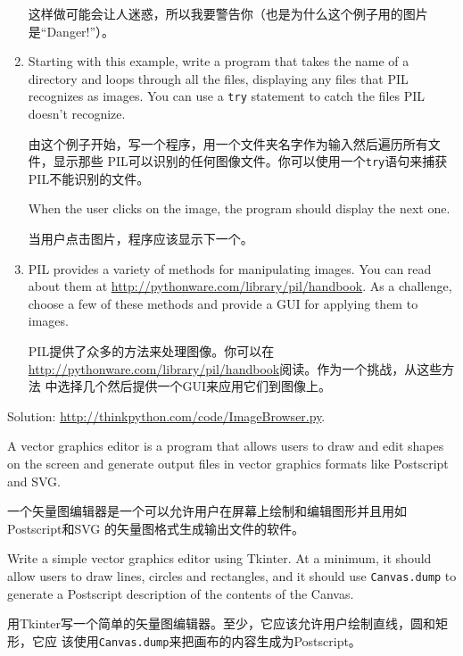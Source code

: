\documentclass[10pt]{book}
\begin{document}
\begin{CJK}{UTF8}{gbsn}
\begin{exercise}
\begin{enumerate}
这样做可能会让人迷惑，所以我要警告你（也是为什么这个例子用的图片是``Danger!''）。

\item Starting with this example, write a program that takes
the name of a directory and loops through all the files, displaying
any files that PIL recognizes as images.  You can use a {\tt try}
statement to catch the files PIL doesn't recognize.

由这个例子开始，写一个程序，用一个文件夹名字作为输入然后遍历所有文件，显示那些
PIL可以识别的任何图像文件。你可以使用一个{\tt try}语句来捕获PIL不能识别的文件。

When the user clicks on the image, the program should display the next one.

当用户点击图片，程序应该显示下一个。

\item PIL provides a variety of methods for manipulating images.
You can read about them at \url{http://pythonware.com/library/pil/handbook}.
As a challenge, choose a few of these methods and provide a
GUI for applying them to images.

PIL提供了众多的方法来处理图像。你可以在
\url{http://pythonware.com/library/pil/handbook}阅读。作为一个挑战，从这些方法
中选择几个然后提供一个GUI来应用它们到图像上。

\end{enumerate}

Solution: \url{http://thinkpython.com/code/ImageBrowser.py}.

\end{exercise}


\begin{exercise}

A vector graphics editor is a program that allows users to draw and
edit shapes on the screen and generate output files in vector graphics
formats like Postscript and SVG.

一个矢量图编辑器是一个可以允许用户在屏幕上绘制和编辑图形并且用如Postscript和SVG
的矢量图格式生成输出文件的软件。

Write a simple vector graphics editor using Tkinter.  At a
minimum, it should allow users to draw lines, circles and
rectangles, and it should use {\tt Canvas.dump} to
generate a Postscript description of the contents of the
Canvas.

用Tkinter写一个简单的矢量图编辑器。至少，它应该允许用户绘制直线，圆和矩形，它应
该使用{\tt Canvas.dump}来把画布的内容生成为Postscript。


\end{exercise}
\end{CJK}
\end{document}
